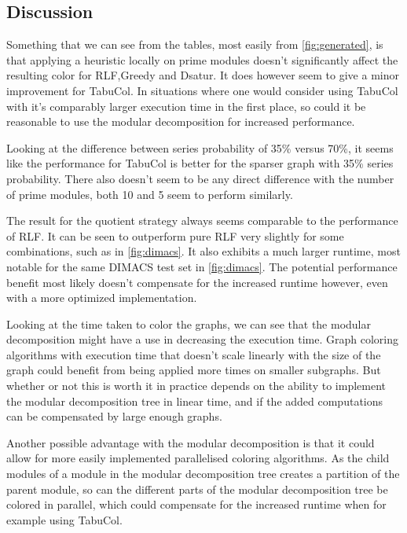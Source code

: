 \documentclass[a4paper]{article}
\begin{document}
\FloatBarrier
\subsection{Discussion}

Something that we can see from the tables, most easily from
\autoref{fig:generated}, is that applying a heuristic locally on prime modules
doesn't significantly affect the resulting color for RLF,Greedy and Dsatur. It
does however seem to give a minor improvement for TabuCol. In situations where
one would consider using TabuCol with it's comparably larger execution time in
the first place, so could it be reasonable to use the modular decomposition for
increased performance.

Looking at the difference between series probability of 35\% versus 70\%, it
seems like the performance for TabuCol is better for the sparser graph with
35\% series probability. There also doesn't seem to be any direct difference
with the number of prime modules, both 10 and 5 seem to perform similarly.

The result for the quotient strategy always seems comparable to the performance
of RLF. It can be seen to outperform pure RLF very slightly for some
combinations, such as in \autoref{fig:dimacs}. It also exhibits a much larger
runtime, most notable for the same DIMACS test set in \autoref{fig:dimacs}.  The
potential performance benefit most likely doesn't compensate for the increased
runtime however, even with a more optimized implementation.

Looking at the time taken to color the graphs, we can see that the modular
decomposition might have a use in decreasing the execution time. Graph coloring
algorithms with execution time that doesn't scale linearly with the size of the
graph could benefit from being applied more times on smaller subgraphs. But
whether or not this is worth it in practice depends on the ability to implement
the modular decomposition tree in linear time, and if the added computations
can be compensated by large enough graphs.

Another possible advantage with the modular decomposition is that it could
allow for more easily implemented parallelised coloring algorithms. As the
child modules of a module in the modular decomposition tree creates a partition
of the parent module, so can the different parts of the modular decomposition
tree be colored in parallel, which could compensate for the increased runtime
when for example using TabuCol.
\end{document}
